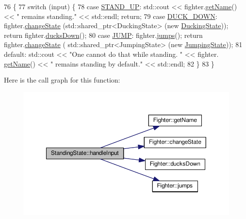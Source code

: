 \begin{DoxyCode}
76                                                                \{
77     \textcolor{keywordflow}{switch} (input) \{
78         \textcolor{keywordflow}{case} \hyperlink{State_8cpp_a080a822f0093973313bd644e517a5090a4e0f05b608ae82cd3d38087399f6962a}{STAND\_UP}:  std::cout << fighter.\hyperlink{classFighter_aea4a9cf98a672b2305d1147885b91c34}{getName}() << \textcolor{stringliteral}{" remains standing."} << std::endl;
        \textcolor{keywordflow}{return};
79         \textcolor{keywordflow}{case} \hyperlink{State_8cpp_a080a822f0093973313bd644e517a5090af82233b8404f602e50c8fb3fff20db8d}{DUCK\_DOWN}:  fighter.\hyperlink{classFighter_add08055f60abd6e9235291b653f65be5}{changeState} (std::shared\_ptr<DuckingState> (\textcolor{keyword}{new} 
      \hyperlink{classDuckingState}{DuckingState}));  \textcolor{keywordflow}{return} fighter.\hyperlink{classFighter_afff11a1b3dacee662cb3fbe35f54df17}{ducksDown}();
80         \textcolor{keywordflow}{case} \hyperlink{State_8cpp_a080a822f0093973313bd644e517a5090a1f28d4392b1c1e7da2af2283632d81e1}{JUMP}:  fighter.\hyperlink{classFighter_a32a4250077afba9b3629a8f553dd8776}{jumps}();  \textcolor{keywordflow}{return} fighter.\hyperlink{classFighter_add08055f60abd6e9235291b653f65be5}{changeState} (
      std::shared\_ptr<JumpingState> (\textcolor{keyword}{new} \hyperlink{classJumpingState}{JumpingState}));
81         \textcolor{keywordflow}{default}:  std::cout << \textcolor{stringliteral}{"One cannot do that while standing.  "} << fighter.
      \hyperlink{classFighter_aea4a9cf98a672b2305d1147885b91c34}{getName}() << \textcolor{stringliteral}{" remains standing by default."} << std::endl;
82     \}
83 \}
\end{DoxyCode}


Here is the call graph for this function\+:
\nopagebreak
\begin{figure}[H]
\begin{center}
\leavevmode
\includegraphics[width=350pt]{classStandingState_a63e99bb4fb71ef88ba573ad902337e7c_cgraph}
\end{center}
\end{figure}


